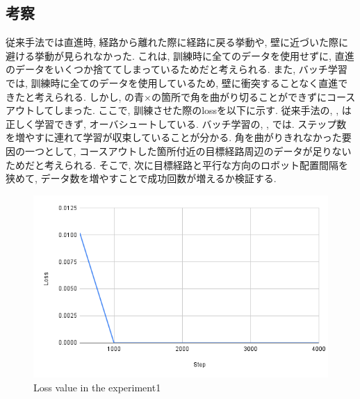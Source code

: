 \newpage
\subsection{考察}
従来手法では直進時, 経路から離れた際に経路に戻る挙動や, 壁に近づいた際に避ける挙動が見られなかった. これは, 訓練時に全てのデータを使用せずに, 直進のデータをいくつか捨ててしまっているためだと考えられる. また, バッチ学習では, 訓練時に全てのデータを使用しているため, 壁に衝突することなく直進できたと考えられる. しかし, の青×の箇所で角を曲がり切ることができずにコースアウトしてしまった. ここで, 訓練させた際のlossを以下に示す. 従来手法の, , は正しく学習できず, オーバシュートしている. バッチ学習の, , では. ステップ数を増やすに連れて学習が収束していることが分かる. 角を曲がりきれなかった要因の一つとして, コースアウトした箇所付近の目標経路周辺のデータが足りないためだと考えられる. そこで, 次に目標経路と平行な方向のロボット配置間隔を狭めて, データ数を増やすことで成功回数が増えるか検証する. 

\newpage
\begin{figure}[h]
  \centering
  \includegraphics[keepaspectratio, scale=0.31]{images/exp1.1_4000.png}
  \caption{Loss value in the experiment1}
  \label{Fig:exp1.1_4000}
  \end{figure}


